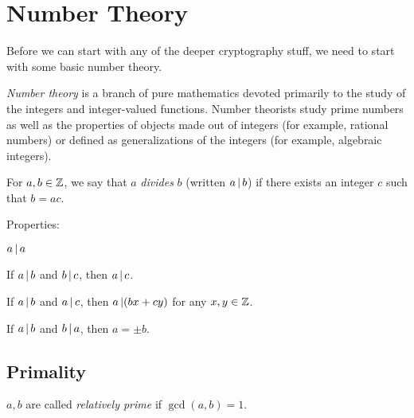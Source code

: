 \section{Number Theory}\label{sec:Number_Theory}
Before we can start with any of the deeper cryptography stuff, we need to start with some basic number theory.
\begin{definition}\label{def:Number_Theory}
  \emph{Number theory} is a branch of pure mathematics devoted primarily to the study of the integers and integer-valued functions.
  Number theorists study prime numbers as well as the properties of objects made out of integers (for example, rational numbers) or defined as generalizations of the integers (for example, algebraic integers).
\end{definition}

\begin{definition}[Divides]\label{def:Divides}
  For $a, b \in \operatorname{\mathbb{Z}}$, we say that $a$ \emph{divides} $b$ (written $a \operatorname{\vert} b$) if there exists an integer $c$ such that $b = ac$.

  Properties:
  \begin{propertylist}
  \item $a \operatorname{\vert} a$
  \item If $a \operatorname{\vert} b$ and $b \operatorname{\vert} c$, then $a \operatorname{\vert} c$.
  \item If $a \operatorname{\vert} b$ and $a \operatorname{\vert} c$, then $a \operatorname{\vert} (bx + cy)$ for any $x, y \in \operatorname{\mathbb{Z}}$.
  \item If $a \operatorname{\vert} b$ and $b \operatorname{\vert} a$, then $a = \pm b$.
  \end{propertylist}
\end{definition}







\subsection{Primality}\label{subsec:Primality}
\begin{definition}\label{def:Relatively_Prime}
  $a, b$ are called \emph{relatively prime} if $\gcd(a, b) = 1$.
\end{definition}


